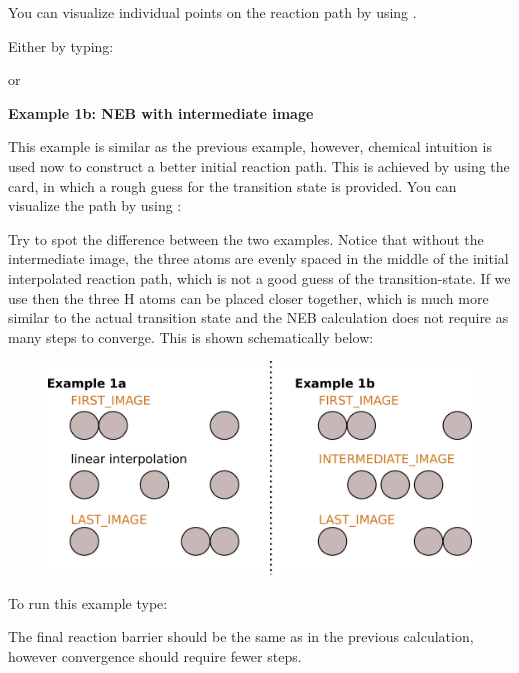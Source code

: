 \documentclass[landscape]{foils}
\begin{document}
You can visualize individual points on the reaction path by using .

Either by typing:


or


{\bf Example 1b: NEB with intermediate image}

This example is similar as the previous example, however, chemical
intuition is used now to construct a better initial reaction path. This is
achieved by using the  card, in which a
rough guess for the transition state is provided. You can visualize
the path by using :


Try to spot the difference between the two examples. Notice that
without the intermediate image, the three atoms are evenly spaced in
the middle of the initial interpolated reaction path, which is not a
good guess of the transition-state. If we use
 then the three H atoms can be placed closer
together, which is much more similar to the actual transition state and the
NEB calculation does not require as many steps to converge. This is
shown schematically below:

\begin{figure}
  \centering
    \includegraphics[width=22cm]{figs/neb-w-intermimage.pdf}
\end{figure}

To run this example type:

{\small {}}

The final reaction barrier should be the same as in the previous
calculation, however convergence should require fewer steps.
\end{document}
